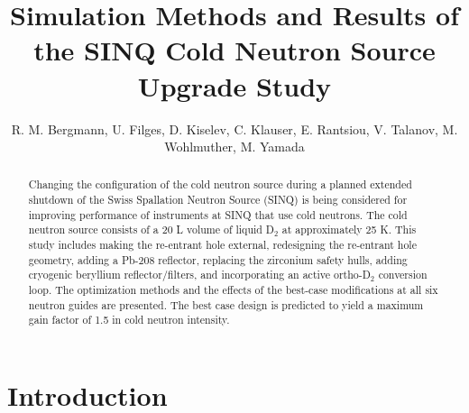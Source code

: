 \documentclass[a4paper]{jpconf}
\begin{document}
\title{Simulation Methods and Results of the SINQ Cold Neutron Source Upgrade Study } %

\author{R. M. Bergmann, U. Filges, D. Kiselev, C. Klauser, E. Rantsiou, V. Talanov, M. Wohlmuther, M. Yamada} %

\address{Paul Scherrer Institut, Villigen, Switzerland}


\begin{abstract}

\noindent Changing the configuration of the cold neutron source during a planned extended shutdown of the Swiss Spallation Neutron Source (SINQ) is being considered for improving performance of instruments at SINQ that use cold neutrons.  The cold neutron source consists of a 20 L volume of liquid D$_2$ at approximately 25 K.  This study includes making the re-entrant hole external, redesigning the re-entrant hole geometry, adding a Pb-208 reflector, replacing the zirconium safety hulls, adding cryogenic beryllium reflector/filters, and incorporating an active ortho-D$_2$ conversion loop.  The optimization methods and the effects of the best-case modifications at all six neutron guides are presented.  The best case design is predicted to yield a maximum gain factor of 1.5 in cold neutron intensity.  

\end{abstract}


\section{Introduction}
\end{document}

